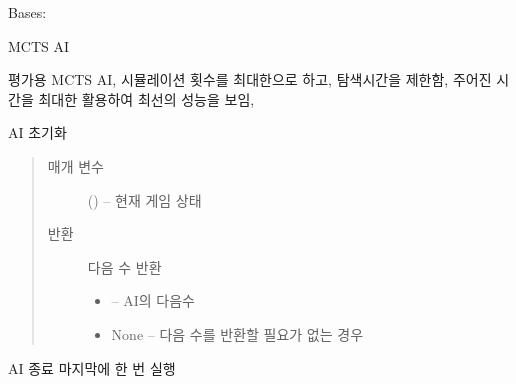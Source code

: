 \documentclass[letterpaper,10pt,english]{sphinxmanual}
\begin{document}

\begin{fulllineitems}
\label{\detokenize{agents.search:agents.search.mcts_agent.MCTSAgent}}
Bases: {\hyperref[\detokenize{agents:agents.BaseAgent}]{}}

MCTS AI

평가용 MCTS AI,
시뮬레이션 횟수를 최대한으로 하고, 탐색시간을 제한함,
주어진 시간을 최대한 활용하여 최선의 성능을 보임,

\begin{fulllineitems}
\label{\detokenize{agents.search:agents.search.mcts_agent.MCTSAgent.act}}
AI 초기화
\begin{quote}\begin{description}
\item[{매개 변수}] \leavevmode
{} ({\hyperref[\detokenize{scripts:scripts.run_game.State}]{}}) -- 현재 게임 상태

\item[{반환}] \leavevmode

다음 수 반환
\begin{itemize}
\item {} 
 -- AI의 다음수

\item {} 
None -- 다음 수를 반환할 필요가 없는 경우

\end{itemize}


\end{description}\end{quote}

\end{fulllineitems}


\begin{fulllineitems}
\label{\detokenize{agents.search:agents.search.mcts_agent.MCTSAgent.close}}
AI 종료
마지막에 한 번 실행


\end{fulllineitems}
\end{fulllineitems}
\end{document}
